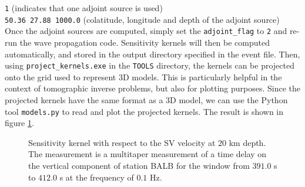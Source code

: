 \texttt{1} (indicates that one adjoint source is used)\\
\texttt{50.36 27.88 1000.0} (colatitude, longitude and depth of the adjoint source)\\[7pt]
Once the adjoint sources are computed, simply set the \texttt{adjoint\_flag} to \texttt{2} and re-run the wave propagation code. Sensitivity kernels will then be computed automatically, and stored in the output directory specified in the event file. Then, using \texttt{project\_kernels.exe} in the \texttt{TOOLS} directory, the kernels can be projected onto the grid used to represent 3D models. This is particularly helpful in the context of tomographic inverse problems, but also for plotting purposes. Since the projected kernels have the same format as a 3D model, we can use the Python tool \texttt{models.py} to read and plot the projected kernels. The result is shown in figure \ref{F:kernel}.
\begin{center}
\begin{figure}
\center{} 
\caption{Sensitivity kernel with respect to the SV velocity at $20$ km depth. The measurement is  a multitaper measurement of a time delay on the vertical component of station BALB for the window from $391.0$ s to $412.0$ s at the frequency of $0.1$ Hz.}\label{F:kernel}
\end{figure}
\end{center}


